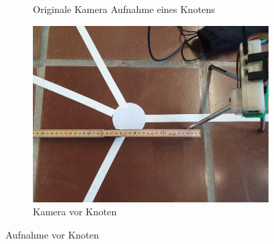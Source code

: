 \begin{enumerate}
\begin{figure}[H]
\begin{subfigure}{0.25\textwidth}
        \caption{Originale Kamera Aufnahme eines Knotens}
        \label{fig:before-node}
        \end{subfigure}
        \begin{subfigure}{0.5\textwidth}
        \centering
        \includegraphics[width=0.95\linewidth]{assets/informatik-prototyp/opencv/camera_position_before_node.jpg} 
        \caption{Kamera vor Knoten}
        \label{fig:before-node-camera}
        \vspace{5mm}
        \end{subfigure}
        \caption{Aufnahme vor Knoten}
        \label{fig:image-before-node}
        \end{figure}


\end{enumerate}
